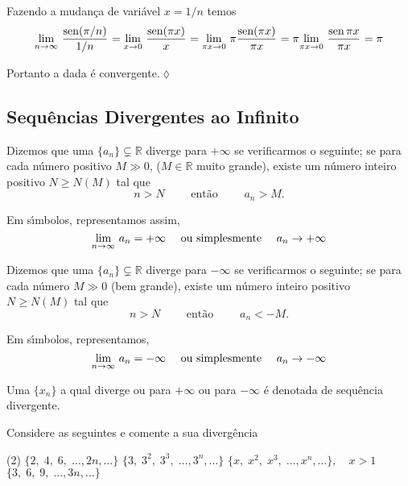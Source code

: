 Fazendo a mudan\c{c}a de vari\'{a}vel $x=1/n$ temos
\begin{equation*}
\displaystyle{\lim_{n\to \infty}\,{\frac{\operatorname{sen}(\pi/n)}{1/n}}_{}}=\displaystyle{\lim_{x\to 0}\,{\frac{\operatorname{sen}(\pi
x)}{x}}_{}}=\displaystyle{\lim_{\pi x\to 0}\,{\pi\frac{\operatorname{sen}(\pi x)}{\pi
x}}_{}}=\pi\displaystyle{\lim_{\pi x\to 0}\,{\frac{\operatorname{sen}\pi x }{\pi x}}_{}}=\pi
\end{equation*}

Portanto a \seq dada \'{e} convergente.\hfill \(\lozenge\)

\subsection{Sequ\^{e}ncias Divergentes ao Infinito}
\begin{defi}[] Dizemos que uma \seq $\{a_{n}\}\subsetneq \mathbb{R}$  diverge para
$+\infty$ se verificarmos o seguinte; se para cada n\'{u}mero positivo $M\gg 0$, ($M \in
\mathbb{R}$ muito grande), existe um n\'{u}mero inteiro positivo $N\geq N(M)$  tal que
\begin{equation*}
 n>N \qquad \text{ ent\~{a}o }\qquad a_n> M.
\end{equation*}

Em s\'{\i}mbolos, representamos assim,
\begin{equation*}
  \displaystyle{\lim_{n\to \infty}\,{a}_{n}}=+\infty\quad \text{ ou simplesmente }\quad a_n\to +\infty
\end{equation*}
\end{defi}

\begin{defi}[] Dizemos que uma \seq $\{a_{n}\}\subsetneq \mathbb{R}$ diverge para
$-\infty$ se verificarmos o seguinte; se para cada n\'{u}mero $M\gg 0$ (bem grande), existe um n\'{u}mero inteiro positivo $N\geq N(M)$  tal que
\begin{equation*}
 n>N\qquad \text{ ent\~{a}o }\qquad  a_n<-M.
\end{equation*}

Em s\'{\i}mbolos, representamos,
\begin{equation*}
  \displaystyle{\lim_{n\to \infty}\,{a}_{n}}=-\infty\quad \text{ ou simplesmente }\quad a_n\to -\infty
\end{equation*}
\end{defi}

Uma \seq $\{x_n\}$ a qual diverge ou para $+\infty$ ou para $-\infty$ \'{e} denotada de
sequ\^{e}ncia divergente.

\begin{exer}
Considere as seguintes \seqs e comente a sua diverg\^{e}ncia
\begin{tasks}[label=\rm{(\alph*)},item-indent=3em,label-width=3ex,ref=(\alph*)](2)
\task \(\{2,\; 4,\; 6,\;\ldots,2n,\ldots \}\)
\task  \(\{3,\; 3^2,\; 3^3,\;\ldots,3^n,\ldots\}\)
\task  \(\{x,\; x^2,\; x^3,\;\ldots,x^n,\ldots  \}, \quad x>1\)
\task  \(\{3,\; 6,\; 9,\;\ldots,3n,\ldots \}\)
\end{tasks}
\end{exer}

